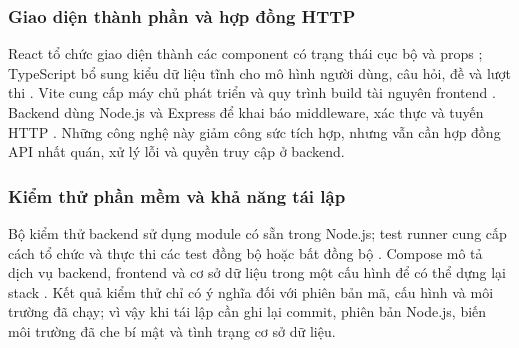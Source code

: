 \subsubsection{Giao diện thành phần và hợp đồng HTTP}
React tổ chức giao diện thành các component có trạng thái cục bộ và props
\cite{ReactDocs}; TypeScript bổ sung kiểu dữ liệu tĩnh cho mô hình người
dùng, câu hỏi, đề và lượt thi \cite{TypeScriptDocs}. Vite cung cấp máy chủ
phát triển và quy trình build tài nguyên frontend
\cite{ViteDocs}. Backend dùng Node.js và Express để khai báo middleware,
xác thực và tuyến HTTP \cite{NodeDocs,ExpressDocs}. Những công nghệ này
giảm công sức tích hợp, nhưng vẫn cần hợp đồng API nhất quán, xử lý lỗi và
quyền truy cập ở backend.

\subsubsection{Kiểm thử phần mềm và khả năng tái lập}
Bộ kiểm thử backend sử dụng module  có sẵn trong Node.js;
test runner cung cấp cách tổ chức và thực thi các test đồng bộ hoặc bất
đồng bộ \cite{NodeTestDocs}. Compose mô tả dịch vụ backend, frontend và cơ
sở dữ liệu trong một cấu hình để có thể dựng lại stack
\cite{DockerComposeDocs}. Kết quả kiểm thử chỉ có ý nghĩa đối với phiên bản
mã, cấu hình và môi trường đã chạy; vì vậy khi tái lập cần ghi lại commit,
phiên bản Node.js, biến môi trường đã che bí mật và tình trạng cơ sở dữ liệu.
